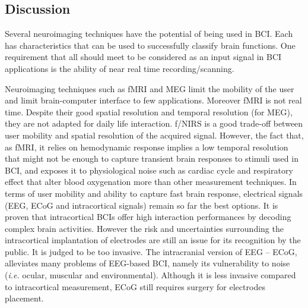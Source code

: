 
\subsection{Discussion}
\label{subsec:signal_acq_discussion}

Several neuroimaging techniques have the potential of being used in BCI. 
Each has characteristics that can be used to successfully classify brain functions.
One requirement that all should meet to be considered as an input signal in BCI applications is the ability of near real time recording/scanning. 

Neuroimaging techniques such as fMRI and MEG limit the mobility of the user and limit  brain-computer interface to few applications. 
Moreover fMRI is not real time.
Despite their good spatial resolution and temporal resolution (for MEG), they are not adapted for daily life interaction. 
f/NIRS is a good trade-off between user mobility and spatial resolution of the acquired signal. 
However, the fact that, as fMRI, it relies on hemodynamic response implies a low temporal resolution that might not be enough to capture transient brain responses to stimuli used in BCI, and exposes it to physiological noise such as cardiac cycle and respiratory effect that alter blood oxygenation more than other measurement techniques. 
In terms of user mobility and ability to capture fast brain response, electrical signals (EEG, ECoG and intracortical signals) remain so far the best options.
It is proven that intracortical BCIs offer high interaction performances by decoding complex brain activities. 
However the risk and uncertainties surrounding the intracortical implantation of electrodes are still an issue for its recognition by the public. It is judged to be too invasive.
The intracranial version of EEG -- ECoG, alleviates many problems of EEG-based BCI, namely its vulnerability to noise (\textit{i.e.} ocular, muscular and environmental). 
Although it is less invasive compared to intracortical measurement, ECoG still requires surgery for electrodes placement. 

